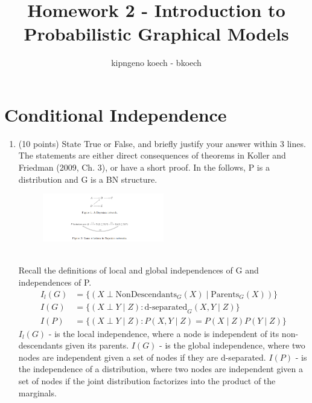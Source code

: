 \documentclass[a3paper,12pt]{extarticle} %
\begin{document}
\author{kipngeno koech - bkoech}
\title{Homework 2 - Introduction to Probabilistic Graphical Models}   
\maketitle

\medskip

\maketitle
\section{Conditional Independence}
\begin{enumerate}
    \item (10 points) State True or False, and briefly justify your answer within 3 lines. The statements are either
    direct consequences of theorems in Koller and Friedman (2009, Ch. 3), or have a short proof. In the
    follows, P is a distribution and G is a BN structure.
    \begin{figure}[h!]
        \centering
        \includegraphics[width=0.5\textwidth]{"conditional_independence.png"}
        \label{fig:example_image}
    \end{figure}
    \\ Recall the definitions of local and global independences of G and independences of P.
    \begin{align}
        I_l(G) &= \{(X \perp \text{NonDescendants}_G(X) \mid \text{Parents}_G(X))\} \\
        I(G) &= \{(X \perp Y \mid Z) : \text{d-separated}_G(X, Y \mid Z)\} \\
        I(P) &= \{(X \perp Y \mid Z) : P(X, Y \mid Z) = P(X \mid Z)P(Y \mid Z)\}
    \end{align}
    \(I_l(G)\) - is the local independence, where a node is independent of its non-descendants given its parents. \(I(G)\) - is the global independence, where two nodes are independent given a set of nodes if they are d-separated. \(I(P)\) - is the independence of a distribution, where two nodes are independent given a set of nodes if the joint distribution factorizes into the product of the marginals.

\end{enumerate}
\end{document}

